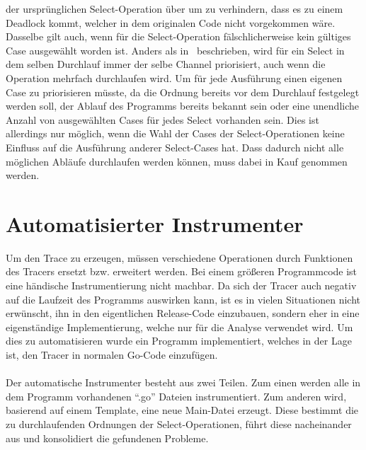 der ursprünglichen Select-Operation über um zu verhindern, dass es zu einem 
Deadlock kommt, welcher in dem originalen Code nicht vorgekommen wäre.
Dasselbe gilt auch, wenn für die Select-Operation fälschlicherweise kein 
gültiges Case ausgewählt worden ist. Anders als in~\cite{gfuzz} beschrieben,
wird für ein Select in dem selben Durchlauf immer der selbe Channel priorisiert, 
auch wenn die Operation mehrfach durchlaufen wird. Um für jede Ausführung einen
eigenen Case zu priorisieren müsste, da die Ordnung bereits vor dem 
Durchlauf festgelegt werden soll, der Ablauf des Programms bereits 
bekannt sein oder eine unendliche Anzahl von ausgewählten Cases für jedes Select
vorhanden sein. Dies ist allerdings nur möglich, wenn die Wahl der Cases der 
Select-Operationen keine Einfluss auf die Ausführung anderer Select-Cases 
hat. Dass dadurch nicht alle möglichen Abläufe durchlaufen werden können, 
muss dabei in Kauf genommen werden.

\section{Automatisierter Instrumenter}\label{Chap:Instrumenter-Sec:Instrumenter}
Um den Trace zu erzeugen, müssen verschiedene Operationen durch Funktionen
des Tracers ersetzt bzw. erweitert werden. Bei einem größeren 
Programmcode ist eine händische Instrumentierung nicht machbar.
Da sich der Tracer auch negativ auf die Laufzeit des Programms 
auswirken kann, ist es in vielen Situationen nicht erwünscht, ihn in den 
eigentlichen Release-Code einzubauen, sondern eher in eine eigenständige 
Implementierung, welche nur für die Analyse verwendet wird. Um dies zu
automatisieren wurde ein Programm implementiert, welches in der 
Lage ist, den Tracer in normalen Go-Code einzufügen.\\\\

Der automatische Instrumenter besteht aus zwei Teilen. 
Zum einen werden alle 
in dem Programm vorhandenen ``.go'' Dateien instrumentiert. 
Zum anderen 
wird, basierend auf einem Template, eine neue Main-Datei erzeugt.
Diese bestimmt die zu durchlaufenden Ordnungen der Select-Operationen,
führt diese nacheinander aus und konsolidiert die gefundenen Probleme. 

